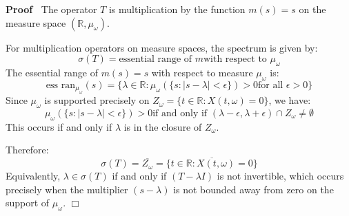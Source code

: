 \documentclass{article}
\newenvironment{proof}{\noindent\textbf{Proof\ }}{\hspace*{\fill}$\Box$\medskip}
\begin{document}
\begin{proof}
  The operator $T$ is multiplication by the function $m (s) = s$ on the
  measure space $(\mathbb{R}, \mu_{\omega})$.
  
  For multiplication operators on measure spaces, the spectrum is given by:
  \begin{equation}
    \sigma (T) = \text{essential range of } m \text{with respect to }
    \mu_{\omega}
  \end{equation}
  The essential range of $m (s) = s$ with respect to measure $\mu_{\omega}$
  is:
  \begin{equation}
    \text{ess ran}_{\mu_{\omega}} (s) = \{\lambda \in \mathbb{R}: \mu_{\omega}
    (\{s : |s - \lambda | < \epsilon\}) > 0 \text{for all } \epsilon > 0\}
  \end{equation}
  Since $\mu_{\omega}$ is supported precisely on $Z_{\omega} = \{t \in
  \mathbb{R}: X (t, \omega) = 0\}$, we have:
  \begin{equation}
    \mu_{\omega} (\{s : |s - \lambda | < \epsilon\}) > 0 \text{if and only if
    } (\lambda - \epsilon, \lambda + \epsilon) \cap Z_{\omega} \neq \emptyset
  \end{equation}
  This occurs if and only if $\lambda$ is in the closure of $Z_{\omega}$.
  
  Therefore:
  \begin{equation}
    \sigma (T) = \overline{Z_{\omega}} = \overline{\{t \in \mathbb{R}: X (t,
    \omega) = 0\}}
  \end{equation}
  Equivalently, $\lambda \in \sigma (T)$ if and only if $(T - \lambda I)$ is
  not invertible, which occurs precisely when the multiplier $(s - \lambda)$
  is not bounded away from zero on the support of $\mu_{\omega}$.
\end{proof}
\end{document}
